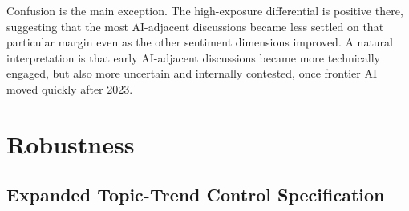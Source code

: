 \documentclass[11pt]{article}
\begin{document}
Confusion is the main exception. The high-exposure differential is positive there, suggesting that the most AI-adjacent discussions became less settled on that particular margin even as the other sentiment dimensions improved. A natural interpretation is that early AI-adjacent discussions became more technically engaged, but also more uncertain and internally contested, once frontier AI moved quickly after 2023.

\begin{table}[!htbp]
    \centering
    \caption{High-vs-Low AI Exposure Heterogeneity: Preferred Full Specification}
    \label{tab:highlow_summary}
    \footnotesize
    \setlength{\tabcolsep}{5pt}
    \renewcommand{\arraystretch}{1.0}
    {\captionsetup{justification=raggedright,singlelinecheck=false}
    \caption*{\footnotesize Notes: Significance is based on year-clustered standard errors. * \(p<0.1\), ** \(p<0.05\), *** \(p<0.01\).}}
\end{table}

\FloatBarrier

\section{Robustness}
\label{sec:robustness}

\subsection{Expanded Topic-Trend Control Specification}
\end{document}
